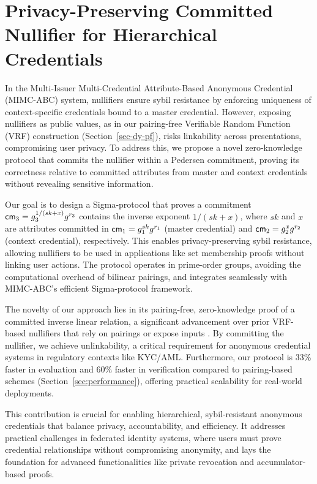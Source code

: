 \newpage
\section{Privacy-Preserving Committed Nullifier for Hierarchical Credentials}
\label{sec:committed-nullifier}

In the Multi-Issuer Multi-Credential Attribute-Based Anonymous Credential (MIMC-ABC) system, nullifiers ensure sybil resistance by enforcing uniqueness of context-specific credentials bound to a master credential. However, exposing nullifiers as public values, as in our pairing-free Verifiable Random Function (VRF) construction (Section~\ref{sec-dy-pf}), risks linkability across presentations, compromising user privacy. To address this, we propose a novel zero-knowledge protocol that commits the nullifier within a Pedersen commitment, proving its correctness relative to committed attributes from master and context credentials without revealing sensitive information.

Our goal is to design a Sigma-protocol that proves a commitment $\mathsf{cm}_3 = g_3^{1/(sk + x)} g^{r_3}$ contains the inverse exponent $1/(sk + x)$, where $sk$ and $x$ are attributes committed in $\mathsf{cm}_1 = g_1^{sk} g^{r_1}$ (master credential) and $\mathsf{cm}_2 = g_2^{x} g^{r_2}$ (context credential), respectively. This enables privacy-preserving sybil resistance, allowing nullifiers to be used in applications like set membership proofs without linking user actions. The protocol operates in prime-order groups, avoiding the computational overhead of bilinear pairings, and integrates seamlessly with MIMC-ABC's efficient Sigma-protocol framework.

The novelty of our approach lies in its pairing-free, zero-knowledge proof of a committed inverse linear relation, a significant advancement over prior VRF-based nullifiers that rely on pairings or expose inputs \cite{hutchison_verifiable_2005,tomescu2022utt}. By committing the nullifier, we achieve unlinkability, a critical requirement for anonymous credential systems in regulatory contexts like KYC/AML. Furthermore, our protocol is 33\% faster in evaluation and 60\% faster in verification compared to pairing-based schemes (Section~\ref{sec:performance}), offering practical scalability for real-world deployments.

This contribution is crucial for enabling hierarchical, sybil-resistant anonymous credentials that balance privacy, accountability, and efficiency. It addresses practical challenges in federated identity systems, where users must prove credential relationships without compromising anonymity, and lays the foundation for advanced functionalities like private revocation and accumulator-based proofs.

